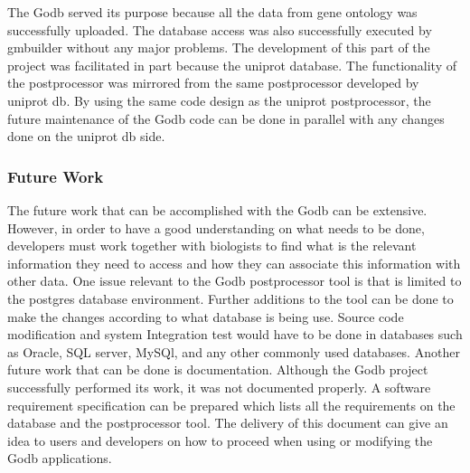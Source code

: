 The Godb served its purpose because all the data from gene ontology was successfully uploaded.  The database access was also
successfully executed by gmbuilder without any major problems.  The development of this part of the project was facilitated
in part because the uniprot database.  The functionality of the postprocessor was mirrored from the same postprocessor
developed by uniprot db.  By using the same code design as the uniprot postprocessor, the future maintenance of the Godb
code can be done in parallel with any changes done on the uniprot db side.

\subsubsection{Future Work}
The future work that can be accomplished with the Godb can be extensive.  However, in order to have a good understanding on
what needs to be done, developers must work together with biologists to find what is the relevant information they need to
access and how they can associate this information with other data. One issue relevant to the Godb postprocessor tool is
that is limited to the postgres database environment.  Further additions to the tool can be done to make the changes
according to what database is being use.  Source code modification and system Integration test would have to be done in
databases such as Oracle, SQL server, MySQl, and any other commonly used databases.  Another future work that can be done is
documentation.  Although the Godb project successfully performed its work, it was not documented properly.  A software
requirement specification can be prepared which lists all the requirements on the database and the postprocessor tool.  The
delivery of this document can give an idea to users and developers on how to proceed when using or modifying the Godb
applications.

%

